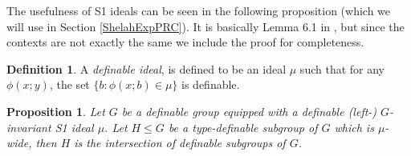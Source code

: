 \documentclass[12pt]{article}
\newtheorem{prop}[thm]{Proposition}
\theoremstyle{definition}
\newtheorem{defi}[thm]{Definition}
\theoremstyle{mystyle}
\theoremstyle{remark}
\begin{document}
The usefulness of S1 ideals can be seen in the following
proposition (which we will use in Section \ref{ShelahExpPRC}). It
is basically Lemma 6.1 in \cite{HrPi}, but since the contexts are
not exactly the same we include the proof for completeness.

\begin{defi}
A \emph{definable ideal}, is defined to be an ideal $\mu$ such
that for any $\phi(x;y)$, the set $\{b : \phi(x;b)\in \mu\}$ is
definable.
\end{defi}


\begin{prop}\label{TdefGps}
Let $G$ be a definable group equipped with a definable (left-)
$G$-invariant S1 ideal $\mu$. Let $H\leq G$ be a type-definable
subgroup of $G$ which is $\mu$-wide, then $H$ is the intersection
of definable subgroups of $G$.
\end{prop}
\end{document}
